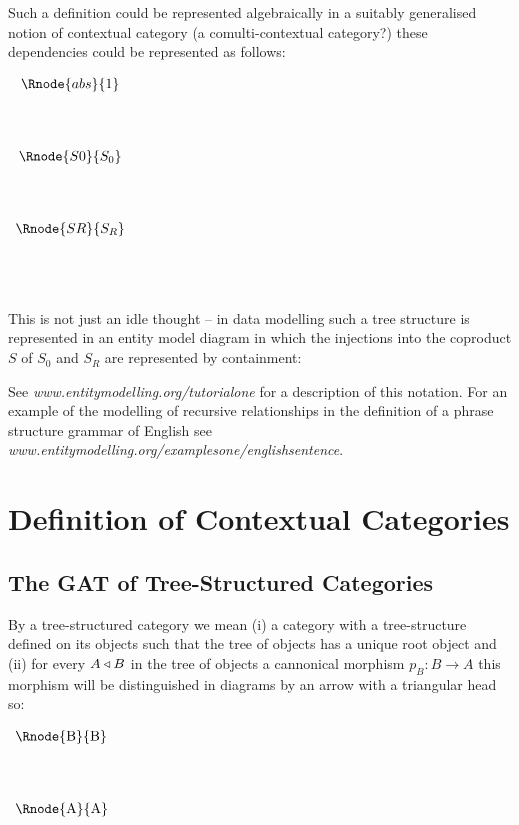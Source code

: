 \documentclass[10pt,a4paper]{article}
\begin{document}
Such a definition could be represented algebraically in a suitably generalised notion of contextual category (a comulti-contextual category?) these dependencies could be represented
as follows:  

\begin{center}
$
\begin{array}{c c}
\Rnode{abs}{1}  \\ [1.4cm]
\Rnode{S0}{S_0} \\ [1.4cm]
\Rnode{SR}{S_R} \\ [1.4cm]
\end{array}
$
\end{center}

\noindent This is not just an idle thought -- in  data modelling such a tree 
structure is represented in an entity model diagram in which the injections into the coproduct $S$ of $S_0$ and $S_R$ are represented by containment: \\

\begin{center}

\end {center}
See \textit{www.entitymodelling.org/tutorialone} for a description of this notation.
For an example of the modelling of recursive relationships in the definition of a phrase structure grammar of English see 
\textit{www.entitymodelling.org/examplesone/englishsentence}.

\section{Definition of Contextual Categories}
\subsection {The GAT of Tree-Structured Categories}

By a tree-structured category we mean (i) a category with a tree-structure defined on its objects such that the tree of objects has a unique root object and (ii) for every $A \triangleleft B$ in the tree of objects  a cannonical morphism $p_B:B \rightarrow A$ this morphism will be distinguished in diagrams by an arrow with  
a triangular head so:

\begin{center}
$
\begin{array}{p{2cm}p{0.5cm}p{0.5cm}p{0.5cm}}
\Rnode{B}{B}& \\ [1.4cm]
\Rnode{A}{A} \\
\end{array}
$

\end{center}
\end{document}
